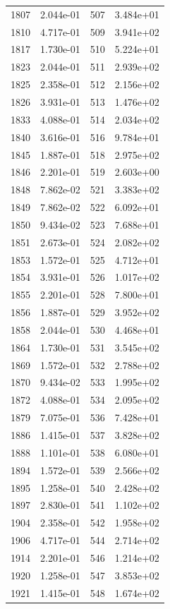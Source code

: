 \documentclass[12pt]{article}
\begin{document}
\begin{longtable}{@{}cccc@{}}
1807 & 2.044e-01 & 507 & 3.484e+01 \\
1810 & 4.717e-01 & 509 & 3.941e+02 \\
1817 & 1.730e-01 & 510 & 5.224e+01 \\
1823 & 2.044e-01 & 511 & 2.939e+02 \\
1825 & 2.358e-01 & 512 & 2.156e+02 \\
1826 & 3.931e-01 & 513 & 1.476e+02 \\
1833 & 4.088e-01 & 514 & 2.034e+02 \\
1840 & 3.616e-01 & 516 & 9.784e+01 \\
1845 & 1.887e-01 & 518 & 2.975e+02 \\
1846 & 2.201e-01 & 519 & 2.603e+00 \\
1848 & 7.862e-02 & 521 & 3.383e+02 \\
1849 & 7.862e-02 & 522 & 6.092e+01 \\
1850 & 9.434e-02 & 523 & 7.688e+01 \\
1851 & 2.673e-01 & 524 & 2.082e+02 \\
1853 & 1.572e-01 & 525 & 4.712e+01 \\
1854 & 3.931e-01 & 526 & 1.017e+02 \\
1855 & 2.201e-01 & 528 & 7.800e+01 \\
1856 & 1.887e-01 & 529 & 3.952e+02 \\
1858 & 2.044e-01 & 530 & 4.468e+01 \\
1864 & 1.730e-01 & 531 & 3.545e+02 \\
1869 & 1.572e-01 & 532 & 2.788e+02 \\
1870 & 9.434e-02 & 533 & 1.995e+02 \\
1872 & 4.088e-01 & 534 & 2.095e+02 \\
1879 & 7.075e-01 & 536 & 7.428e+01 \\
1886 & 1.415e-01 & 537 & 3.828e+02 \\
1888 & 1.101e-01 & 538 & 6.080e+01 \\
1894 & 1.572e-01 & 539 & 2.566e+02 \\
1895 & 1.258e-01 & 540 & 2.428e+02 \\
1897 & 2.830e-01 & 541 & 1.102e+02 \\
1904 & 2.358e-01 & 542 & 1.958e+02 \\
1906 & 4.717e-01 & 544 & 2.714e+02 \\
1914 & 2.201e-01 & 546 & 1.214e+02 \\
1920 & 1.258e-01 & 547 & 3.853e+02 \\
1921 & 1.415e-01 & 548 & 1.674e+02 \\

\end{longtable}
\end{document}
